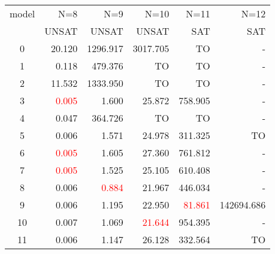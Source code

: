  \begin{tabular}[c] {|c||r|r|r|r|r|}\hline
  model & N=8                     & N=9                    & N=10                    & N=11                    & N=12 \\
        & UNSAT                   & UNSAT                  & UNSAT                   & SAT                     & SAT  \\\hline
  0     & 20.120                  & 1296.917               & 3017.705                & TO                      & -    \\
  1     & 0.118                   & 479.376                & TO                      & TO                      & -    \\
  2     & 11.532                  & 1333.950               & TO                      & TO                      & -    \\
  3     & \textcolor{red}{0.005}  & 1.600                  & 25.872                  & 758.905                 & -    \\
  4     & 0.047                   & 364.726                & TO                      & TO                      & -    \\
  5     & 0.006                   & 1.571                  & 24.978                  & 311.325                 & TO   \\
  6     & \textcolor{red}{0.005}  & 1.605                  & 27.360                  & 761.812                 & -    \\
  7     & \textcolor{red}{0.005}  & 1.525                  & 25.105                  & 610.408                 & -    \\
  8     & 0.006                   & \textcolor{red}{0.884} & 21.967                  & 446.034                 & -    \\
  9     & 0.006                   & 1.195                  & 22.950                  & \textcolor{red}{81.861} & 142694.686   \\
  10    & 0.007                   & 1.069                  & \textcolor{red}{21.644} & 954.395                 & -    \\
  11    & 0.006                   & 1.147                  & 26.128                  & 332.564                 & TO   \\\hline
 \end{tabular}
